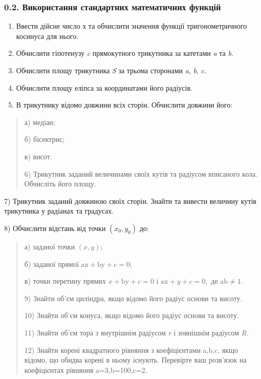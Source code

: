 \documentclass[]{article}
\begin{document}
\subsubsection{0.2. Використання стандартних математичних
функцій}\label{ux432ux438ux43aux43eux440ux438ux441ux442ux430ux43dux43dux44f-ux441ux442ux430ux43dux434ux430ux440ux442ux43dux438ux445-ux43cux430ux442ux435ux43cux430ux442ux438ux447ux43dux438ux445-ux444ux443ux43dux43aux446ux456ux439}

\begin{enumerate}
\def\labelenumi{\arabic{enumi})}
\item
  Ввести дійсне число х та обчислити значення функції тригонометричного
  косинуса для нього.
\item
  Обчислити гіпотенузу \emph{c} прямокутного трикутника за катетами
  \emph{a} та \emph{b}.
\item
  Обчислити площу трикутника \emph{S} за трьома сторонами \emph{a},
  \emph{b}, \emph{c}.
\item
  Обчислити площу еліпса за координатами його радіусів.
\item
  В трикутнику відомо довжини всіх сторін. Обчислити довжини його:
\end{enumerate}

\begin{quote}
а) медіан;

б) бісектрис;

в) висот.

6) Трикутник заданий величинами своїх кутів та радіусом вписаного кола.
Обчисліть його площу.
\end{quote}

7) Трикутник заданий довжиною своїх сторін. Знайти та вивести величину
кутів трикутника у радіанах та градусах.

8) Обчислити відстань від точки \(\left( x_{0},y_{0} \right)\) до:

\begin{quote}
а) заданої точки \(\left( x,y \right);\)

б) заданої прямої \(\mathrm{\text{ax}} + \mathrm{\text{by}} + c = 0\);

в) точки перетину прямих \(x + \mathrm{\text{by}} + c = 0\) і
\(\mathrm{\text{ax}} + y + c = 0,\) де
\(\mathrm{\text{ab}} \neq 1\mathrm{.}\)

9) Знайти об'єм циліндра, якщо відомо його радіус основи та висоту.

10) Знайти об'єм конуса, якщо відомо його радіус основи та висоту.

11) Знайти об'єм тора з внутрішнім радіусом \emph{r} і зовнішнім
радіусом \emph{R.}

12) Знайти корені квадратного рівняння з коефіцієнтами a,b,c, якщо
відомо, що обидва корені в ньому існують. Перевірте ваш розв'язок на
коефіцієнтах рівняння a=3,b=100,c=2.
\end{quote}
\end{document}
